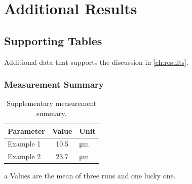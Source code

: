 
\chapter{Additional Results}
\label{app:results}

\section{Supporting Tables}

Additional data that supports the discussion in \cref{ch:results}.

\subsection{Measurement Summary}

\begin{table}[htbp]
  \centering
  \begin{threeparttable}
  \caption{Supplementary measurement summary.}
  \label{tab:app-b-1}
  \begin{tabular}{l S[table-format=2.1] l}
    \toprule
    Parameter & {Value} & Unit \\
    \midrule
    Example 1 & 10.5 & \si{\micro\meter} \\
    Example 2 & 23.7 & \si{\micro\meter} \\
    \bottomrule
  \end{tabular}
  \begin{tablenotes}\footnotesize
    \item[a] Values are the mean of three runs and one lucky one.
  \end{tablenotes}
  \end{threeparttable}
\end{table}
